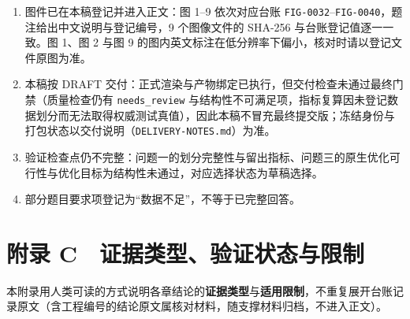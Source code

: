 \documentclass[11pt,a4paper]{article}
\providecommand{\tightlist}{%
  \setlength{\itemsep}{0pt}\setlength{\parskip}{0pt}}
\begin{document}
\begin{enumerate}
\def\labelenumi{\arabic{enumi}.}
\tightlist
\item
  图件已在本稿登记并进入正文：图 1--9 依次对应台账
  \texttt{FIG-0032}--\texttt{FIG-0040}，题注给出中文说明与登记编号，9
  个图像文件的 SHA-256 与台账登记值逐一一致。图 1、图 2 与图 9
  的图内英文标注在低分辨率下偏小，核对时请以登记文件原图为准。
\item
  本稿按 DRAFT
  交付：正式渲染与产物绑定已执行，但交付检查未通过最终门禁（质量检查仍有
  \texttt{needs\_review}
  与结构性不可满足项，指标复算因未登记数据划分而无法取得权威测试真值），因此本稿不冒充最终提交版；冻结身份与打包状态以交付说明（\texttt{DELIVERY-\allowbreak{}NOTES.md}）为准。
\item
  验证检查点仍不完整：问题一的划分完整性与留出指标、问题三的原生优化可行性与优化目标为结构性未通过，对应选择状态为草稿选择。
\item
  部分题目要求项登记为``数据不足''，不等于已完整回答。
\end{enumerate}

\section*{附录
C　证据类型、验证状态与限制}\label{ux9644ux5f55-c-ux8bc1ux636eux7c7bux578bux9a8cux8bc1ux72b6ux6001ux4e0eux9650ux5236}

本附录用人类可读的方式说明各章结论的\textbf{证据类型}与\textbf{适用限制}，不重复展开台账记录原文（含工程编号的结论原文属核对材料，随支撑材料归档，不进入正文）。
\end{document}
